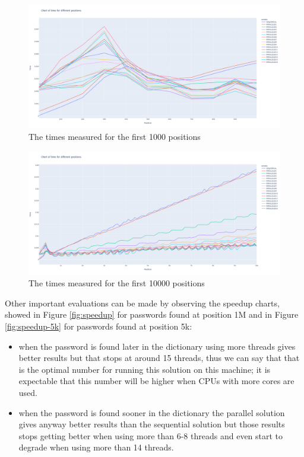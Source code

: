 \documentclass[10pt,twocolumn,letterpaper]{article}
\begin{document}
    \begin{figure}
    \begin{center}
    \includegraphics[width=1.0\linewidth]{./img/positions-1000.png}
    \end{center}
        \caption{The times measured for the first 1000 positions}
    \label{fig:position-1000}
    \end{figure}

    \begin{figure}
    \begin{center}
    \includegraphics[width=1.0\linewidth]{./img/positions-10k.png}
    \end{center}
        \caption{The times measured for the first 10000 positions}
    \label{fig:position-10k}
    \end{figure}

    Other important evaluations can be made by observing the speedup charts, showed in Figure
    \ref{fig:speedup} for passwords found at position 1M and in Figure \ref{fig:speedup-5k}
    for passwords found at position 5k:

    \begin{itemize}
        \item when the password is found later in the dictionary using more threads gives
              better results but that stops at around 15 threads, thus we can say that that
              is the optimal number for running this solution on this machine; it is
              expectable that this number will be higher when CPUs with more cores
              are used.
        \item when the password is found sooner in the dictionary the parallel solution gives
              anyway better results than the sequential solution but those results stops
              getting better when using more than 6-8 threads and even start to degrade when
              using more than 14 threads.
    \end{itemize}
\end{document}
